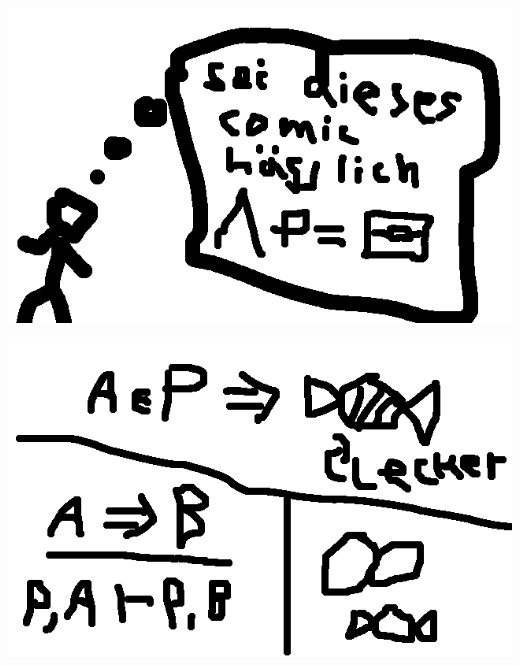\documentclass{beamer}
\begin{document}
\begin{frame}
  \includegraphics[width=\framewidth]{comic6.png}
\end{frame}
\begin{frame}
  \includegraphics[width=\framewidth]{comic7.png}
\end{frame}
\end{document}
